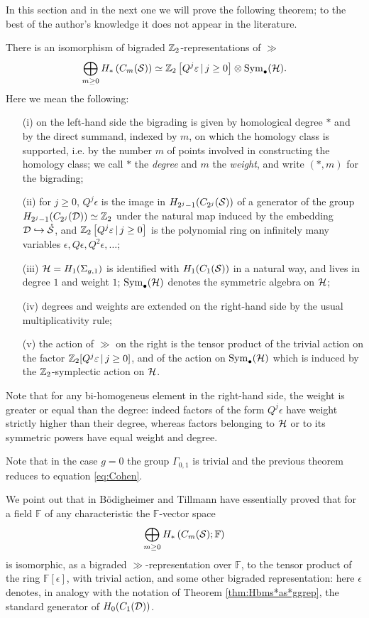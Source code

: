 In this section and in the next one we will prove the following theorem; to the best of the author's knowledge
it does not appear in the literature.
\begin{thm}
 \label{thm:Hbms*as*ggrep}
 There is an isomorphism of bigraded $\Z_2$-representations of $\gg$
 \[
  \bigoplus_{m\geq 0} H_*\pa{\cms}\simeq \Z_2\left[Q^j\epsilon\,|\, j\geq 0\right]\otimes\Sym_{\bullet}(\H).
 \]
 Here we mean the following:
 \begin{itemize}
  \item[(i)] on the left-hand side the bigrading is given by homological degree $*$ and by the direct summand,
  indexed by $m$,
  on which the homology class is supported, i.e. by the number $m$ of points
  involved in constructing the homology class; we call $*$ the \emph{degree} and $m$ the \emph{weight},
  and write $(*,m)$ for the bigrading;
  \item[(ii)] for $j\geq 0$, $Q^j\epsilon$ is the image in $H_{2^j-1}(C_{2^j}(\S))$ of a generator
  of the group $H_{2^j-1}(C_{2^j}(\D))\simeq \Z_2$ 
  under the natural map induced by the embedding $\D\hookrightarrow\mrS$,
  and $\Z_2\left[Q^j\epsilon\,|\, j\geq 0\right]$ is the polynomial ring on
  infinitely many variables $\epsilon,Q\epsilon,Q^2\epsilon,\dots$;
  \item[(iii)] $\H=H_1(\sg)$ is identified with $H_1(C_1(\S))$ in a natural way, and lives in degree $1$ and weight $1$;
  $\Sym_{\bullet}(\H)$ denotes the symmetric algebra on $\H$;
  \item[(iv)] degrees and weights are extended on the right-hand side by the usual multiplicativity rule;
  \item[(v)] the action of $\gg$ on the right is the tensor product of the trivial action
  on the factor $\Z_2[Q^j\epsilon\,|\, j\geq 0]$, and of the action on
  $\Sym_{\bullet}(\H)$ which is induced by the $\Z_2$-symplectic action on $\H$.
  \end{itemize}
\end{thm}
Note that for any bi-homogeneus element in the right-hand side, the weight is greater or equal than
the degree: indeed factors of the form $Q^j\epsilon$ have weight strictly higher than their degree,
whereas factors belonging to $\H$ or to its symmetric powers have equal weight and degree.
  
Note that in the case $g=0$ the group $\Gamma_{0,1}$ is trivial and the previous theorem
reduces to equation \eqref{eq:Cohen}.

We point out that in \cite{BoT} B\"{o}digheimer and Tillmann have essentially proved that for a field
$\mathbb{F}$ of any characteristic the $\mathbb{F}$-vector space
\[
  \bigoplus_{m\geq 0} H_*\pa{\cms;\mathbb{F}}
\]
is isomorphic, as a bigraded $\gg$-representation over $\mathbb{F}$, to the tensor product
of the ring $\mathbb{F}[\epsilon]$, with trivial action, and some other bigraded representation:
here $\epsilon$ denotes, in analogy with the notation of Theorem \ref{thm:Hbms*as*ggrep}, the standard generator of $H_0(C_1(\D))$.

